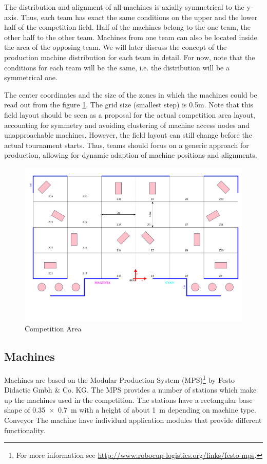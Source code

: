 \documentclass[12pt,twoside]{article}
\begin{document}
The distribution and alignment of all machines is axially symmetrical
to the y-axis. Thus, each team has exact the same conditions on the
upper and the lower half of the competition field. Half of the 
machines belong to the one team, the other
half to the other team. Machines from one team can also be located inside
the area of the opposing team. We will later discuss the concept of
the production machine distribution for each team in detail. For now,
note that the conditions for each team will be the same, i.e. the
distribution will be a symmetrical one.

The center coordinates and the size of the zones in which the machines could
be read out from the figure \ref{fig:competition-area}. The grid size 
(smallest step) is 0.5m. 
Note that this field layout should be seen as a proposal for the actual
competition area layout, accounting for symmetry and avoiding
clustering of machine access nodes and unapproachable
machines. However, the field layout can still change before the actual
tournament starts. Thus, teams should focus on a generic approach for
production, allowing for dynamic adaption of machine positions and
alignments.

\begin{figure}[H]
  \label{fig:competition-area}
  \includegraphics[angle=-90 , trim = 50 50 10 0, scale=0.85]{field.pdf}
  \caption{Competition Area}
\end{figure}

\subsection{Machines}
\label{sec:machines}
Machines are based on the Modular Production System (MPS)\footnote{For
  more information see
  \url{http://www.robocup-logistics.org/links/festo-mps}.} by Festo
Didactic Gmbh \& Co. KG. The MPS provides a number of stations which
make up the machines used in the competition. The stations have a
rectangular base shape of \SI{0,35 x 0,7}{\metre} with a height of
about \SI{1}{\metre} depending on machine type. Conveyor The machine
have individual application modules that provide different
functionality.
\end{document}
